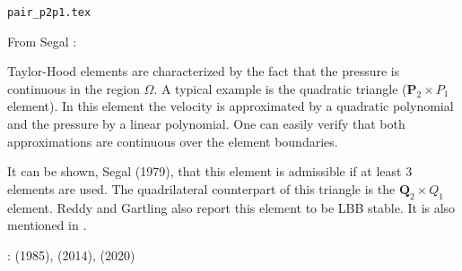 \begin{flushright} {\tiny {\color{gray} \tt pair\_p2p1.tex}} \end{flushright}

\noindent
\begin{minipage}{0.54\textwidth}
From Segal \cite{segal}: 
\begin{displayquote}
{\color{darkgray}
Taylor-Hood elements \cite{taho73} 
are characterized by the fact that the pressure is continuous in the region $\Omega$. 
A typical example is the quadratic triangle (${\bm P}_2\times P_1$ element).
In this element the velocity is approximated by a quadratic polynomial and the pressure by a
linear polynomial. One can easily verify that both approximations are continuous over 
the element boundaries.}
\end{displayquote}

It can be shown, Segal (1979), that this element is admissible if at least 3 elements 
are used. The quadrilateral counterpart of this triangle is the ${\bm Q}_2\times Q_1$ element.
Reddy and Gartling \cite[p179]{reddybook2} also report this element to be LBB stable.
It is also mentioned in \textcite{nath93}.

\Literature: \textcite{scan85} (1985), \textcite{lejx14} (2014), \textcite{cump20} (2020)
\end{minipage}
\hfill
\begin{minipage}{0.42\textwidth}
\begin{center}

\end{center}
\end{minipage}



